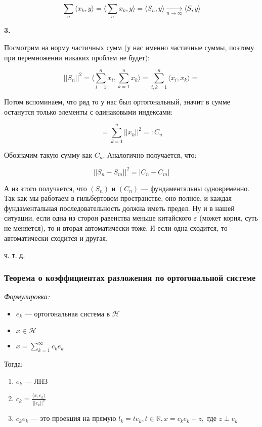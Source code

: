 \documentclass{article}
\def\goesto#1{\underset{#1}{\longrightarrow}}
\def\toinf#1{\goesto{#1 \rightarrow \infty}}
\def\ntoinf{\toinf{n}}
\def\sk#1#2{\langle #1, #2 \rangle}
\begin{document}
\[\sum_n \sk{x_k}{y} = \sk{\sum_n x_k}{y} = \sk{S_n}{y} \ntoinf \sk{S}{y}\]

\textbf{3.}

Посмотрим на норму частичных сумм (у нас именно частичные суммы, поэтому при перемножении никаких проблем не будет):

\[||S_n||^2 = \sk{\sum_{i = 1}^n x_i}{\sum_{k = 1}^n x_k} = \sum_{i, k = 1}^n \sk{x_i}{x_k} =\]

Потом вспоминаем, что ряд то у нас был ортогональный, значит в сумме останутся только элементы с одинаковыми индексами:

\[=\sum_{k = 1}^{n} ||x_k||^2 =: C_n\]

Обозначим такую сумму как $C_n$. Аналогично получается, что:

\[||S_n - S_m||^2 = |C_n - C_m|\]

А из этого получается, что $(S_n)$ и $(C_n)$ --- фундаментальны одновременно. Так как мы работаем в гильбертовом пространстве, оно полное, и каждая фундаментальная последовательность должна иметь предел. Ну и в нашей ситуации, если одна из сторон равенства меньше китайского $\varepsilon$ (может корня, суть не меняется), то и вторая автоматически тоже. И если одна сходится, то автоматически сходится и другая.

ч. т. д. 

\subsubsection{Теорема о коэффициентах разложения по ортогональной системе}
\textit{Формулировка:}

\begin{itemize}
    \item ${e_k}$ --- ортогональная система в $\mathcal{H}$
    \item $x \in \mathcal{H}$
    \item $x = \sum_{k = 1}^{\infty} c_k e_k$
\end{itemize}

Тогда:

\begin{enumerate}
    \item ${e_k}$ --- ЛНЗ
    \item $c_k = \frac{\langle x, e_k \rangle}{||e_k||^2}$
    \item $c_ke_k$ --- это проекция на прямую $l_k = {te_k, t \in \mathbb{R}}, x = c_ke_k + z, $ где $z \perp e_k$
\end{enumerate}
\end{document}
